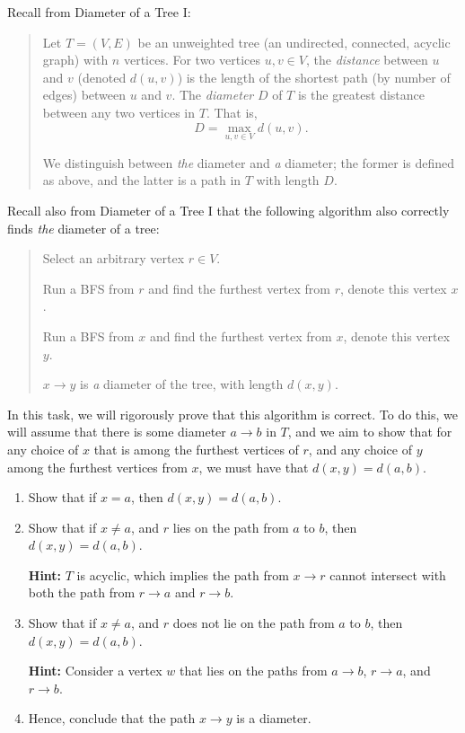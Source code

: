 \documentclass[12pt]{article}
\begin{document}

\begin{question}
Recall from Diameter of a Tree I:
\begin{quote}
    Let $T = (V,E)$ be an unweighted tree (an undirected, connected, acyclic graph) with $n$ vertices. For two vertices $u,v \in V$, the \textit{distance} between $u$ and $v$ (denoted $d(u,v)$) is the length of the shortest path (by number of edges) between $u$ and $v$. The {\em diameter} $D$ of $T$ is the greatest distance between any two vertices in $T$. That is,
\[ D = \max_{u,v\in V} d(u,v). \]

We distinguish between {\em the} diameter and {\em a} diameter; the former is defined as above, and the latter is a path in $T$ with length $D$.
\end{quote}
Recall also from Diameter of a Tree I that the following algorithm also correctly finds {\em the} diameter of a tree:
    \begin{quote}
        Select an arbitrary vertex $r \in V$. 
        
        Run a BFS from $r$ and find the furthest vertex from $r$, denote this vertex $x$. 
        
        Run a BFS from $x$ and find the furthest vertex from $x$, denote this vertex $y$. 
        
        $x \rightarrow y$ is {\em a} diameter of the tree, with length $d(x,y)$.
    \end{quote} 

In this task, we will rigorously prove that this algorithm is correct. To do this, we will assume that there is some diameter $a \to b$ in $T$, and we aim to show that for any choice of $x$ that is among the furthest vertices of $r$, and any choice of $y$ among the furthest vertices from $x$, we must have that $d(x,y) = d(a,b)$.

\begin{enumerate}[label=(\alph*)]
    \item Show that if $x = a$, then $d(x,y) = d(a,b)$.

    \item Show that if $x \neq a$, and $r$ lies on the path from $a$ to $b$, then $d(x,y) = d(a,b)$.
    
    {\textbf{Hint:}} $T$ is acyclic, which implies the path from $x \to r$ cannot intersect with both the path from $r \to a$ and $r \to b$.
    
    \item Show that if $x \neq a$, and $r$ does not lie on the path from $a$ to $b$, then $d(x,y) = d(a,b)$.
    
     {\textbf{Hint:}} Consider a vertex $w$ that lies on the paths from $a \to b$, $r \to a$, and $r \to b$.   
     
    \item Hence, conclude that the path $x \to y$ is a diameter.
\end{enumerate}
\end{question}
\end{document}
